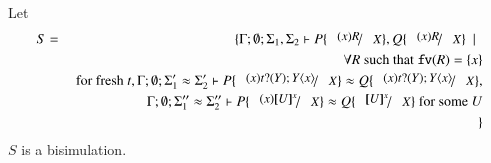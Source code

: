 \begin{comment}
		&\by{\ell}& &
		\newsp{\tilde{s_2'}}{Q_1' \Par \appl{X}{s'} \subst{(x) R'}{X}} \\
	\end{array}
\]
%
	\noi From the definition of $S$ and~\ref{lem:subst_equiv6}
	we also conclude that
	\begin{eqnarray*}
		&&\Gamma; \es; \Sigma_1'\ S\ \Sigma_2' \proves 
		\newsp{\tilde{s_1'}}{P_1 \Par \appl{X}{s} \subst{(x) R' \Par C}{X}}\ S\ \newsp{s_2'}{Q_1' \Par \appl{X}{s'} \subst{(x) R' \Par C}{X}}
	\end{eqnarray*}
	\noi that using substitution can be rewritten as
	\begin{eqnarray*}
		&&\Gamma; \es; \Sigma_1'\ S\ \Sigma_2' \proves 
		\newsp{\tilde{s_1'}}{P_1 \Par \appl{X}{s} \subst{(x) R'}{X} \Par C}\ S\ \newsp{s_2'}{Q_1' \Par \appl{X}{s'} \subst{(x) R'}{X} \Par C}
	\end{eqnarray*}
	\noi with process $C$ being the process derived from action $\ell$
	to complete the bisimulation closure.
\end{proof}
\end{comment}

\begin{corollary}\rm
	\label{cor:subst_equiv}
	Let
	\begin{eqnarray*}
		S &=& \set{ \Gamma; \es; \Sigma_1, \Sigma_2 \proves P \subst{(x) R}{X}, Q \subst{(x) R}{X} \setbar \\
		&& \forall R \textrm{ such that } \fv{R} = \set{x}\\
		&& \textrm{ for fresh } t,  \Gamma; \es; \Sigma_1' \wb \Sigma_2' \proves P \subst{(x) \binp{t}{Y} \appl{Y}{x}}{X} \wb Q \subst{(x) \binp{t}{Y} \appl{Y}{x}}{X}, \\
		&& \Gamma; \es; \Sigma_1'' \wb \Sigma_2'' \proves P \subst{(x) \map{U}^x}{X} \wb Q \subst{\map{U}^x}{X} \textrm{ for some } U \\
		&&}
	\end{eqnarray*}
	$S$ is a bisimulation.
\end{corollary}


